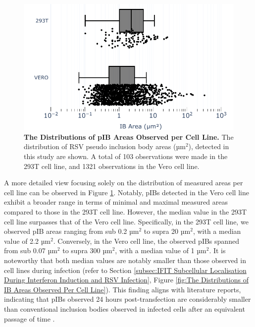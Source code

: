 \begin{figure}
    \centering
    \includegraphics[width=0.75\linewidth]{09. Chapter 4/Figs/01. pIB/01. pIB characterisation/03. box-pib.pdf}
    \caption[The Distributions of pIB Areas Observed per Cell Line.]{\textbf{The Distributions of pIB Areas Observed per Cell Line.} The distribution of RSV pseudo inclusion body areas (\(\mbox{µm}^2\)), detected in this study are shown. A total of 103 observations were made in the 293T cell line, and 1321 observations in the Vero cell line.}
    \label{fig:The Distributions of pIB Areas Observed Per Cell Line}
\end{figure}

A more detailed view focusing solely on the distribution of measured areas per cell line can be observed in Figure \ref{fig:The Distributions of pIB Areas Observed Per Cell Line}. Notably, pIBs detected in the Vero cell line exhibit a broader range in terms of minimal and maximal measured areas compared to those in the 293T cell line. However, the median value in the 293T cell line surpasses that of the Vero cell line. Specifically, in the 293T cell line, we observed pIB areas ranging from sub 0.2 \(\mbox{µm}^2\) to supra 20 \(\mbox{µm}^2\), with a median value of 2.2 \(\mbox{µm}^2\). Conversely, in the Vero cell line, the observed pIBs spanned from sub 0.07 \(\mbox{µm}^2\) to supra 300 \(\mbox{µm}^2\), with a median value of 1 \(\mbox{µm}^2\). It is noteworthy that both median values are notably smaller than those observed in cell lines during infection (refer to Section \ref{subsec:IFIT Subcellular Localisation During Interferon Induction and RSV Infection}, Figure \ref{fig:The Distributions of IB Areas Observed Per Cell Line}). This finding aligns with literature reports, indicating that pIBs observed 24 hours post-transfection are considerably smaller than conventional inclusion bodies observed in infected cells after an equivalent passage of time \cite{Jobe2021BovineResponses}.

